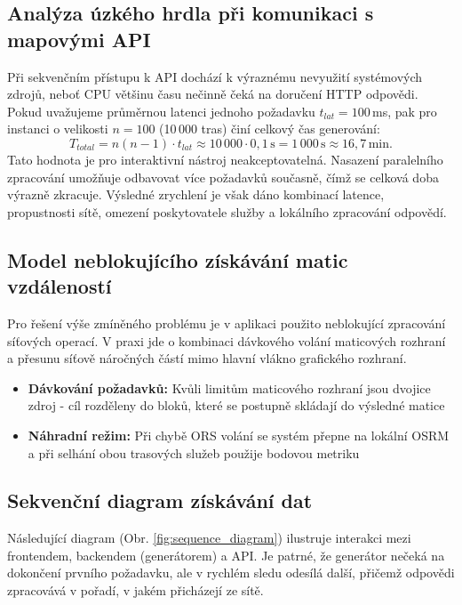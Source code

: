 \subsection{Analýza úzkého hrdla při komunikaci s mapovými API}
Při sekvenčním přístupu k API dochází k výraznému nevyužití systémových zdrojů, neboť CPU většinu času nečinně čeká na doručení HTTP odpovědi. 
Pokud uvažujeme průměrnou latenci jednoho požadavku $t_{lat} = 100$\,ms, pak pro instanci o velikosti $n=100$ (10\,000 tras) činí celkový čas generování:
\begin{equation}
T_{total} = n(n-1) \cdot t_{lat} \approx 10\,000 \cdot 0,1\,\text{s} = 1\,000\,\text{s} \approx 16,7\,\text{min}.
\end{equation}
Tato hodnota je pro interaktivní nástroj neakceptovatelná. Nasazení paralelního zpracování umožňuje odbavovat více požadavků současně, čímž se celková doba výrazně zkracuje. Výsledné zrychlení je však dáno kombinací latence, propustnosti sítě, omezení poskytovatele služby a lokálního zpracování odpovědí.

\subsection{Model neblokujícího získávání matic vzdáleností}
Pro řešení výše zmíněného problému je v aplikaci použito neblokující zpracování síťových operací. V praxi jde o kombinaci dávkového volání maticových rozhraní a přesunu síťově náročných částí mimo hlavní vlákno grafického rozhraní.

\begin{itemize}
    \item \textbf{Dávkování požadavků:} Kvůli limitům maticového rozhraní jsou dvojice zdroj - cíl rozděleny do bloků, které se postupně skládají do výsledné matice
    \item \textbf{Náhradní režim:} Při chybě ORS volání se systém přepne na lokální OSRM a při selhání obou trasových služeb použije bodovou metriku
\end{itemize}

\subsection{Sekvenční diagram získávání dat}
Následující diagram (Obr. \ref{fig:sequence_diagram}) ilustruje interakci mezi frontendem, backendem (generátorem) a API. Je patrné, že generátor nečeká na dokončení prvního požadavku, ale v rychlém sledu odesílá další, přičemž odpovědi zpracovává v pořadí, v jakém přicházejí ze sítě.

